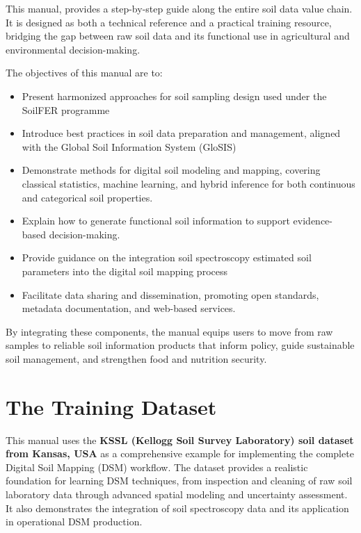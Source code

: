 \documentclass[
  10pt,
  b5paper,
  oneside]{book}
\begin{document}
This manual, provides a step-by-step guide along the entire soil data value chain. It is designed as both a technical reference and a practical training resource, bridging the gap between raw soil data and its functional use in agricultural and environmental decision-making.

The objectives of this manual are to:

\begin{itemize}
\item
  Present harmonized approaches for soil sampling design used under the SoilFER programme
\item
  Introduce best practices in soil data preparation and management, aligned with the Global Soil Information System (GloSIS)
\item
  Demonstrate methods for digital soil modeling and mapping, covering classical statistics, machine learning, and hybrid inference for both continuous and categorical soil properties.
\item
  Explain how to generate functional soil information to support evidence-based decision-making.
\item
  Provide guidance on the integration soil spectroscopy estimated soil parameters into the digital soil mapping process
\item
  Facilitate data sharing and dissemination, promoting open standards, metadata documentation, and web-based services.
\end{itemize}

By integrating these components, the manual equips users to move from raw samples to reliable soil information products that inform policy, guide sustainable soil management, and strengthen food and nutrition security.

\section*{The Training Dataset}\label{the-training-dataset}

This manual uses the \textbf{KSSL (Kellogg Soil Survey Laboratory) soil dataset from Kansas, USA} as a comprehensive example for implementing the complete Digital Soil Mapping (DSM) workflow. The dataset provides a realistic foundation for learning DSM techniques, from inspection and cleaning of raw soil laboratory data through advanced spatial modeling and uncertainty assessment. It also demonstrates the integration of soil spectroscopy data and its application in operational DSM production.
\end{document}
